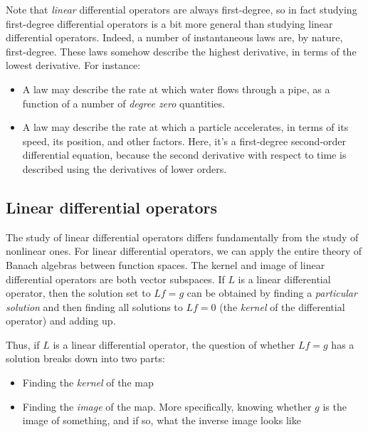 \documentclass[a4paper]{amsart}
\begin{document}
Note that {\em linear} differential operators are always first-degree,
so in fact studying first-degree differential operators is a bit more
general than studying linear differential operators. Indeed, a number
of instantaneous laws are, by nature, first-degree. These laws somehow
describe the highest derivative, in terms of the lowest
derivative. For instance:

\begin{itemize}

\item A law may describe the rate at which water flows through a pipe,
  as a function of a number of {\em degree zero} quantities.

\item A law may describe the rate at which a particle accelerates, in
  terms of its speed, its position, and other factors. Here, it's a
  first-degree second-order differential equation, because the second
  derivative with respect to time is described using the derivatives
  of lower orders.

\end{itemize}

\subsection{Linear differential operators}

The study of linear differential operators differs fundamentally from
the study of nonlinear ones. For linear differential operators, we can
apply the entire theory of Banach algebras between function
spaces. The kernel and image of linear differential operators are both
vector subspaces. If $L$ is a linear differential operator, then the
solution set to $Lf = g$ can be obtained by finding a {\em particular
  solution} and then finding all solutions to $Lf = 0$ (the {\em
  kernel} of the differential operator) and adding up.

Thus, if $L$ is a linear differential operator, the question of
whether $Lf = g$ has a solution breaks down into two parts:

\begin{itemize}

\item Finding the {\em kernel} of the map

\item Finding the {\em image} of the map. More specifically, knowing
  whether $g$ is the image of something, and if so, what the inverse
  image looks like

\end{itemize}
\end{document}
